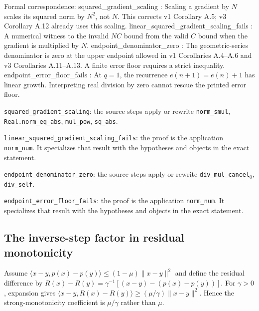 \documentclass[11pt,a4paper]{report}
\begin{document}
\begin{leanbox}
Formal correspondence: squared\_gradient\_scaling : Scaling a gradient by \(N\) scales its squared norm by \(N^2\), not \(N\). This corrects v1 Corollary A.5; v3 Corollary A.12 already uses this scaling. linear\_squared\_gradient\_scaling\_fails : A numerical witness to the invalid \(NC\) bound from the valid \(C\) bound when the gradient is multiplied by \(N\). endpoint\_denominator\_zero : The geometric-series denominator is zero at the upper endpoint allowed in v1 Corollaries A.4--A.6 and v3 Corollaries A.11--A.13. A finite error floor requires a strict inequality. endpoint\_error\_floor\_fails : At \(q=1\), the recurrence \(e(n+1)=e(n)+1\) has linear growth. Interpreting real division by zero cannot rescue the printed error floor.



\texttt{squared\_\allowbreak{}gradient\_\allowbreak{}scaling}: the source steps apply or rewrite \texttt{norm\_\allowbreak{}smul}, \texttt{Real.\allowbreak{}norm\_\allowbreak{}eq\_\allowbreak{}abs}, \texttt{mul\_\allowbreak{}pow}, \texttt{sq\_\allowbreak{}abs}.



\texttt{linear\_\allowbreak{}squared\_\allowbreak{}gradient\_\allowbreak{}scaling\_\allowbreak{}fails}: the proof is the application \texttt{norm\_\allowbreak{}num}. It specializes that result with the hypotheses and objects in the exact statement.



\texttt{endpoint\_\allowbreak{}denominator\_\allowbreak{}zero}: the source steps apply or rewrite \texttt{div\_\allowbreak{}mul\_\allowbreak{}cancel\ensuremath{{}_{0}}}, \texttt{div\_\allowbreak{}self}.



\texttt{endpoint\_\allowbreak{}error\_\allowbreak{}floor\_\allowbreak{}fails}: the proof is the application \texttt{norm\_\allowbreak{}num}. It specializes that result with the hypotheses and objects in the exact statement.
\end{leanbox}
\subsection{\texorpdfstring{The inverse-step factor in residual monotonicity}{The inverse-step factor in residual monotonicity}}
\label{report-step-ProximalLangevin-Corrections-lean-3}


Assume \(\langle x-y,p(x)-p(y)\rangle\le(1-\mu)\|x-y\|^2\) and define the residual difference by \(R(x)-R(y)=\gamma^{-1}[(x-y)-(p(x)-p(y))]\). For \(\gamma>0\), expansion gives \(\langle x-y,R(x)-R(y)\rangle\ge(\mu/\gamma)\|x-y\|^2\). Hence the strong-monotonicity coefficient is \(\mu/\gamma\) rather than \(\mu\).
\end{document}
